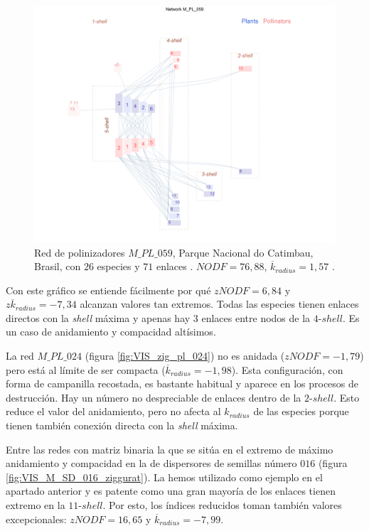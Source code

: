 \begin{figure}[h!]
\centering
\includegraphics[scale=0.42]{Figures/VIS_M_PL_059_ziggurat.png}
\caption {Red de polinizadores $M\_PL\_059$, Parque Nacional do Catimbau, Brasil, con $26$ especies y $71$ enlaces \cite{bezerra2009pollination}. $NODF = 76,88$, $\overline {k}_{radius} = 1,57$ .}
\label{fig:VIS_M_PL_059_ziggurat}
\end{figure}

Con este gráfico se entiende fácilmente por qué $zNODF = 6,84$ y $z \overline {k}_{radius} = -7,34$ alcanzan valores tan extremos. Todas las especies tienen enlaces directos con la \textit{shell} máxima y apenas hay $3$ enlaces entre nodos de la $4$-$shell$. Es un caso de anidamiento y compacidad altísimos.

La red $M\_PL\_024$ (figura \ref{fig:VIS_zig_pl_024}) no es anidada ($zNODF = -1,79$) pero está al límite de ser compacta ($\overline {k}_{radius} = -1,98$). Esta configuración, con forma de campanilla recostada, es bastante habitual y aparece en los procesos de destrucción. Hay un número no despreciable de enlaces dentro de la $2$-$shell$. Esto reduce el valor del anidamiento, pero no afecta al ${k}_{radius}$ de las especies porque tienen también conexión directa con la \textit{shell} máxima.

Entre las redes con matriz binaria la que se sitúa en el extremo de máximo anidamiento y compacidad en la de dispersores de semillas número $016$ (figura \ref{fig:VIS_M_SD_016_ziggurat}). La hemos utilizado como ejemplo en el apartado anterior y es patente como una gran mayoría de los enlaces tienen extremo en la $11$-$shell$. Por esto, los índices reducidos toman también
valores excepcionales: $zNODF = 16,65$ y $\overline {k}_{radius} = -7,99$.


